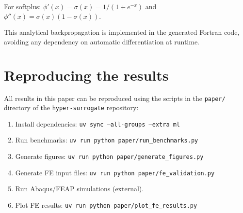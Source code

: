 For softplus: $\phi'(x) = \sigma(x) = 1/(1+e^{-x})$ and
$\phi''(x) = \sigma(x)(1 - \sigma(x))$.

This analytical backpropagation is implemented in the generated Fortran code,
avoiding any dependency on automatic differentiation at runtime.

\section{Reproducing the results}
\label{app:reproduction}

All results in this paper can be reproduced using the scripts in the
\texttt{paper/} directory of the \texttt{hyper-surrogate} repository:

\begin{enumerate}
  \item Install dependencies:
    \texttt{uv sync --all-groups --extra ml}
  \item Run benchmarks:
    \texttt{uv run python paper/run\_benchmarks.py}
  \item Generate figures:
    \texttt{uv run python paper/generate\_figures.py}
  \item Generate FE input files:
    \texttt{uv run python paper/fe\_validation.py}
  \item Run Abaqus/FEAP simulations (external).
  \item Plot FE results:
    \texttt{uv run python paper/plot\_fe\_results.py}
\end{enumerate}

